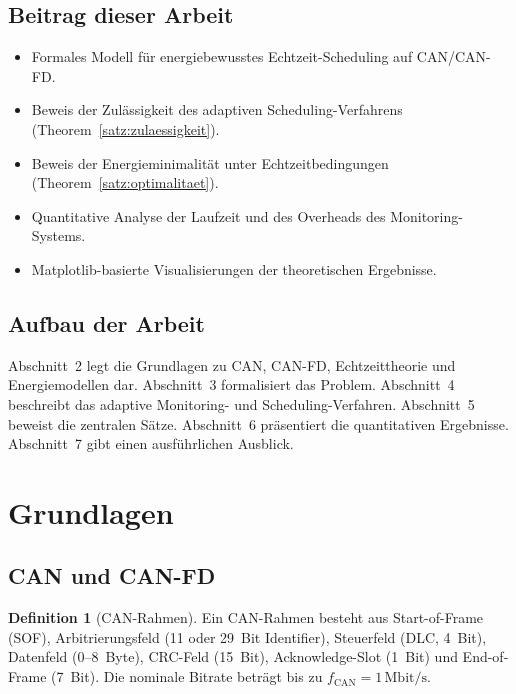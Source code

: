 ﻿\documentclass[a4paper,12pt]{article}
\theoremstyle{definition}
\newtheorem{definition}{Definition}
\begin{document}
\subsection{Beitrag dieser Arbeit}

\begin{itemize}
    \item Formales Modell f\"{u}r energiebewusstes Echtzeit-Scheduling auf CAN/CAN-FD.
    \item Beweis der Zul\"{a}ssigkeit des adaptiven Scheduling-Verfahrens
          (Theorem~\ref{satz:zulaessigkeit}).
    \item Beweis der Energieminimalit\"{a}t unter Echtzeitbedingungen
          (Theorem~\ref{satz:optimalitaet}).
    \item Quantitative Analyse der Laufzeit und des Overheads des Monitoring-Systems.
    \item Matplotlib-basierte Visualisierungen der theoretischen Ergebnisse.
\end{itemize}

\subsection{Aufbau der Arbeit}

Abschnitt~2 legt die Grundlagen zu CAN, CAN-FD, Echtzeittheorie und Energiemodellen dar.
Abschnitt~3 formalisiert das Problem.
Abschnitt~4 beschreibt das adaptive Monitoring- und Scheduling-Verfahren.
Abschnitt~5 beweist die zentralen S\"{a}tze.
Abschnitt~6 pr\"{a}sentiert die quantitativen Ergebnisse.
Abschnitt~7 gibt einen ausf\"{u}hrlichen Ausblick.

\section{Grundlagen}

\subsection{CAN und CAN-FD}

\begin{definition}[CAN-Rahmen]
Ein CAN-Rahmen besteht aus Start-of-Frame (SOF), Arbitrierungsfeld (11 oder 29~Bit
Identifier), Steuerfeld (DLC, 4~Bit), Datenfeld (0--8~Byte), CRC-Feld (15~Bit),
Acknowledge-Slot (1~Bit) und End-of-Frame (7~Bit).
Die nominale Bitrate betr\"{a}gt bis zu $f_{\mathrm{CAN}} = 1\,\text{Mbit/s}$.
\end{definition}
\end{document}
